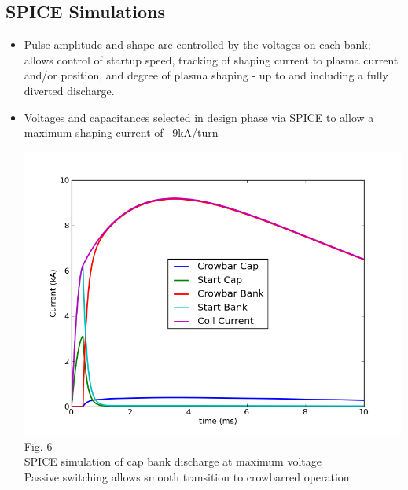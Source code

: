 \documentclass{article}
\begin{document}
\begin{multicols}{5}
\subsection{SPICE Simulations}
\begin{itemize}
\item Pulse amplitude and shape are controlled by the voltages on each bank; allows control of startup speed, tracking of shaping current to plasma current and/or position, and degree of plasma shaping - up to and including a fully diverted discharge.
\item Voltages and capacitances selected in design phase via SPICE to allow a maximum shaping current of ~9kA/turn\\
\begin{center}
\includegraphics[width=0.75\columnwidth]{bank_currents.png}\\
Fig. 6\\
SPICE simulation of cap bank discharge at maximum voltage\\
Passive switching allows smooth transition to crowbarred operation\\
\end{center}
\vspace{.25in}

\end{itemize}
\end{multicols}
\end{document}
